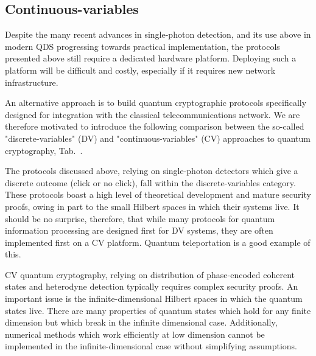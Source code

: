 


\subsection*{Continuous-variables}

Despite the many recent advances in single-photon detection, and its use above in modern QDS progressing towards practical implementation, the protocols presented above still require a dedicated hardware platform. Deploying such a platform will be difficult and costly, especially if it requires new network infrastructure.

An alternative approach is to build quantum cryptographic protocols specifically designed for integration with the classical telecommunications network. We are therefore motivated to introduce the following comparison between the so-called "discrete-variables" (DV) and "continuous-variables" (CV) approaches to quantum cryptography, Tab.~.  

The protocols discussed above, relying on single-photon detectors which give a discrete outcome (click or no click), fall within the discrete-variables category. These protocols boast a high level of theoretical development and mature security proofs, owing in part to the small Hilbert spaces in which their systems live. It should be no surprise, therefore, that while many protocols for quantum information processing are designed first for DV systems, they are often implemented first on a CV platform. Quantum teleportation is a good example of this. 

CV quantum cryptography, relying on distribution of phase-encoded coherent states and heterodyne detection typically requires complex security proofs. An important issue is the infinite-dimensional Hilbert spaces in which the quantum states live. There are many properties of quantum states which hold for any finite dimension but which break in the infinite dimensional case.  Additionally, numerical methods which work efficiently at low dimension  cannot be implemented in the infinite-dimensional case without simplifying assumptions.

